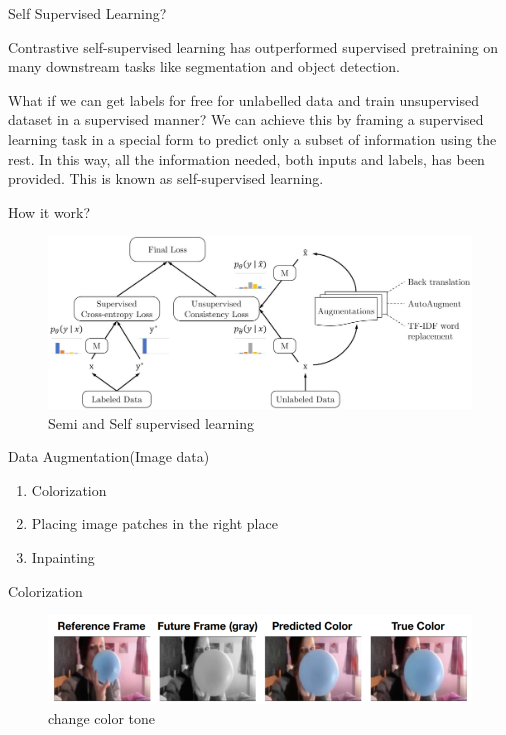 \documentclass{beamer}
\begin{document}
	\begin{frame}[t]{Self Supervised Learning?}\vspace{10pt}
		
		Contrastive self-supervised learning has outperformed supervised pretraining on many downstream tasks like segmentation and object detection.
		
		What if we can get labels for free for unlabelled data and train unsupervised dataset in a supervised manner? We can achieve this by framing a supervised learning task in a special form to predict only a subset of information using the rest. In this way, all the information needed, both inputs and labels, has been provided. This is known as self-supervised learning.
		
	\end{frame}
	
	\begin{frame}[t]{How it work?}\vspace{4pt}
		\begin{figure}
			\centering
			\includegraphics[scale=0.2]{google_semi.jpg}
			\caption{Semi and Self supervised learning}
		\end{figure}
	\end{frame}
	\begin{frame}[t]{Data Augmentation(Image data)}
		\begin{enumerate}
			\item Colorization
			\item Placing image patches in the right place
			\item Inpainting
		\end{enumerate}
	\end{frame}
	
	\begin{frame}{Colorization}\vspace{4pt}
		\begin{figure}
			\centering
			\includegraphics[scale=1]{color.png}
			\caption{change color tone}
		\end{figure}
	\end{frame}
	
\end{document}
